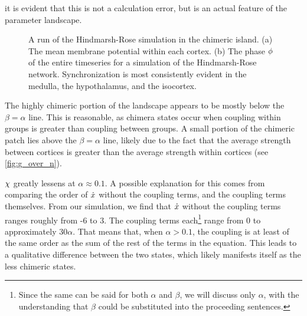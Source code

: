 it is evident that this is not a calculation error, but is an actual feature of the parameter landscape.
\begin{figure}[ht]
  \centering

  \caption[Highly chimeric simulation]{A run of the Hindmarsh-Rose simulation in the chimeric island.
    (a) The mean membrane potential within each cortex.
    (b) The phase $\phi$ of the entire timeseries for a simulation of the Hindmarsh-Rose network.
    Synchronization is most consistently evident in the medulla, the hypothalamus, and the isocortex.
  }
  \label{fig:058_010}
\end{figure}

The highly chimeric portion of the landscape appears to be mostly below the $\beta = \alpha$ line.
This is reasonable, as chimera states occur when coupling within groups is greater than coupling between groups.
A small portion of the chimeric patch lies above the $\beta = \alpha$ line, likely due to the fact that the average strength between cortices is greater than the average strength within cortices (see \cref{fig:g_over_n}).

$\chi$ greatly lessens at $\alpha \approx 0.1$.
A possible explanation for this comes from comparing the order of $\dot{x}$ without the coupling terms, and the coupling terms themselves.
From our simulation, we find that $\dot{x}$ without the coupling terms ranges roughly from -6 to 3.
The coupling terms each\footnote{Since the same can be said for both $\alpha$ and $\beta$, we will discuss only $\alpha$, with the understanding that $\beta$ could be substituted into the proceeding sentences.} range from 0 to approximately $30 \alpha$.
That means that, when $\alpha > 0.1$, the coupling is at least of the same order as the sum of the rest of the terms in the equation.
This leads to a qualitative difference between the two states, which likely manifests itself as the less chimeric states.

